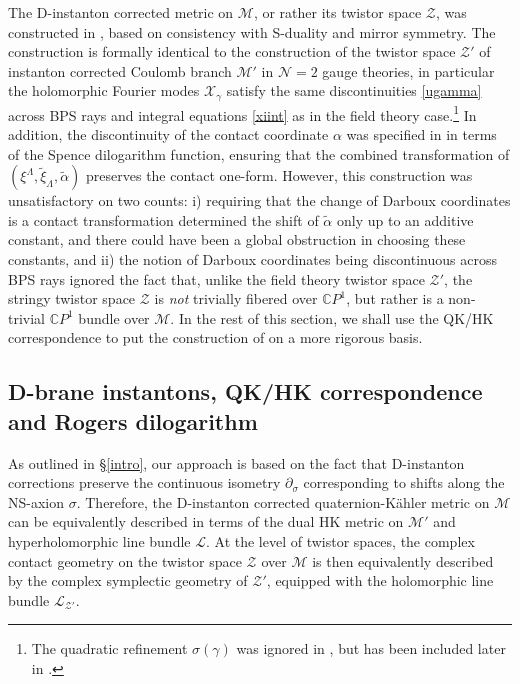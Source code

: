 \documentclass[12pt,reqno]{article}
\numberwithin{equation}{section}
\newcommand{\CP}{\IC P^1}
\newcommand{\cM}{\mathcal{M}}
\newcommand{\cN}{\mathcal{N}}
\newcommand{\cX}{\mathcal{X}}
\newcommand{\cZ}{\mathcal{Z}}
\newcommand{\IC}{\mathbb{C}}
\newcommand{\lb}{\mathscr{L}}
\def\talp{\tilde\alpha}
\def\pa{\partial}
\newcommand{\txi}{\tilde\xi}
\newcommand{\qk}{{quaternion-K\"ahler}\xspace}
\def\pcM{\cM'}
\def\pcZ{\cZ'}
\numberwithin{equation}{section}
\begin{document}
The D-instanton corrected metric on $\cM$, or rather its
twistor space $\cZ$, was constructed in \cite{Alexandrov:2008gh,Alexandrov:2009zh},
based on consistency with S-duality and
mirror symmetry. The
construction is formally identical to the construction of the twistor space $\pcZ$ of
instanton corrected Coulomb branch $\pcM$ in $\cN=2$ gauge theories, in particular
the holomorphic Fourier modes $\cX_\gamma$
satisfy the same discontinuities \eqref{ugamma} across
BPS rays and integral equations \eqref{xiint} as in the field theory
case.\footnote{The quadratic refinement $\sigma(\gamma)$ was ignored in
\cite{Alexandrov:2008gh,Alexandrov:2009zh}, but has been  included later
in \cite{Alexandrov:2010ca}.} In addition, the
discontinuity of the contact coordinate $\alpha$ was specified in
\cite{Alexandrov:2008gh,Alexandrov:2009zh} in terms of the Spence dilogarithm function, ensuring
that the combined transformation of $(\xi^\Lambda,\txi_\Lambda,\talp)$ preserves the contact one-form.
However, this construction was unsatisfactory on two counts:
i) requiring that the change of Darboux coordinates is a contact transformation
determined the shift of $\talp$  only up to an additive constant, and there could
have been a global
obstruction in choosing these constants, and ii) the notion of Darboux coordinates being
discontinuous across BPS rays ignored the fact that, unlike the field theory twistor space
$\pcZ$,  the stringy twistor space $\cZ$ is {\it not} trivially fibered over $\CP$, but rather
is a non-trivial $\CP$ bundle over $\cM$. In the rest of this section, we shall use the
QK/HK correspondence to put the construction of \cite{Alexandrov:2008gh,Alexandrov:2009zh}
on a more rigorous basis.



\subsection{D-brane instantons, QK/HK correspondence and Rogers dilogarithm
\label{sec_rogers}}


As outlined in \S\ref{intro}, our approach is based on the
fact that D-instanton corrections preserve the continuous isometry $\pa_\sigma$
corresponding to shifts along the NS-axion $\sigma$. Therefore, the D-instanton corrected
\qk metric on $\cM$ can be  equivalently described in terms of the dual HK metric on $\pcM$ and
hyperholomorphic line bundle $\lb$. At the level of twistor spaces, the complex
contact geometry on the twistor space $ \cZ$ over  $\cM$ is then equivalently described by
the complex symplectic geometry of $ \pcZ$, equipped
with the holomorphic line bundle $\lb_{\pcZ}$.
\end{document}

